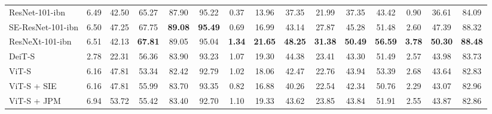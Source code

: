 \begin{table}[t]
\begin{tabular}{l|cc|ccc|ccc|ccc|ccc}
        ResNet-101-ibn           & 6.49  & 42.50  & 65.27                            & 87.90                                & 95.22                                & 0.37                                  & 13.96          & 37.35          & 21.99          & 37.35          & 43.42          & 0.90          & 36.61          & 84.09          \\
        SE-ResNet-101-ibn        & 6.50  & 47.25  & 67.75                            & \textbf{89.08}                       & \textbf{95.49}                       & 0.69                                  & 16.99          & 43.14          & 27.87          & 45.28          & 51.48          & 2.60          & 47.39          & 88.32          \\
        ResNeXt-101-ibn          & 6.51  & 42.13  & \textbf{67.81}                   & 89.05                                & 95.04                                & \textbf{1.34}                         & \textbf{21.65} & \textbf{48.25} & \textbf{31.38} & \textbf{50.49} & \textbf{56.59} & \textbf{3.78} & \textbf{50.30} & \textbf{88.48} \\
        \hline
        DeiT-S                   & 2.78  & 22.31  & 56.36                            & 83.90                                & 93.23                                & 1.07                                  & 19.30          & 44.38          & 23.41          & 43.30          & 51.49          & 2.57          & 43.98          & 83.73          \\
        ViT-S                    & 6.16  & 47.81  & 53.34                            & 82.42                                & 92.79                                & 1.02                                  & 18.06          & 42.47          & 22.76          & 43.94          & 53.39          & 2.68          & 43.64          & 82.83          \\
        ViT-S + SIE              & 6.16  & 47.81  & 55.99                            & 83.70                                & 93.35                                & 0.82                                  & 16.88          & 40.26          & 22.54          & 42.34          & 50.76          & 2.29          & 43.07          & 82.96          \\
        ViT-S + JPM              & 6.94  & 53.72  & 55.42                            & 83.40                                & 92.70                                & 1.10                                  & 19.33          & 43.62          & 23.85          & 43.84          & 51.91          & 2.55          & 43.87          & 82.86          \\

\end{tabular}
\end{table}
